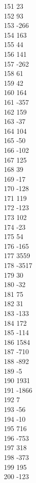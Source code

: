 { 151	23 \\
 152	93 \\
 153	-266 \\
 154	163 \\
 155	44 \\
 156	141 \\
 157	-262 \\
 158	61 \\
 159	42 \\
 160	164 \\
 161	-357 \\
 162	159 \\
 163	-37 \\
 164	104 \\
 165	-50 \\
 166	-102 \\
 167	125 \\
 168	39 \\
 169	-17 \\
 170	-128 \\
 171	119 \\
 172	-123 \\
 173	102 \\
 174	-23 \\
 175	54 \\
 176	-165 \\
 177	3559 \\
 178	-3517 \\
 179	30 \\
 180	-32 \\
 181	75 \\
 182	31 \\
 183	-133 \\
 184	172 \\
 185	-114 \\
 186	1584 \\
 187	-710 \\
 188	-892 \\
 189	-5 \\
 190	1931 \\
 191	-1866 \\
 192	7 \\
 193	-56 \\
 194	-10 \\
 195	716 \\
 196	-753 \\
 197	318 \\
 198	-373 \\
 199	195 \\
 200	-123 \\
}
